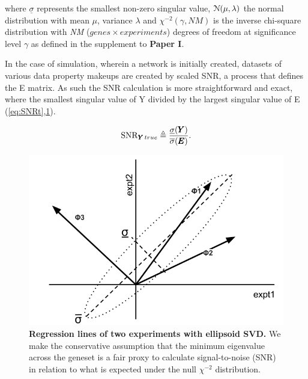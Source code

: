 where $\underline{\sigma}$ represents the smallest non-zero singular value, $\operatorname{\mathcal{N}(\mu,\lambda)}$ the normal distribution with mean $\mu$, variance $\lambda$ and $\chi^{-2}(\gamma,NM)$ is the inverse chi-square distribution with \emph{NM} ($genes \times experiments$) degrees of freedom at significance level $\gamma$ as defined in the supplement to \textbf{Paper I}.

In the case of simulation, wherein a network is initially created, datasets of various data property makeups are created by scaled SNR, a process that defines the E matrix. As such the SNR calculation is more straightforward and exact, where the smallest singular value of Y divided by the largest singular value of E (\cref{eq:SNRt},\cref{fig:SNR}).

\begin{equation}
    \operatorname{SNR}_{{\pmb{Y}}\,true} \triangleq \frac{\underline{\sigma}({\pmb{Y}})}{\overline{\sigma}({\pmb{E}})}.
  \label{eq:SNRt}
\end{equation} 

\begin{figure}[H]
  \begin{center}
    \includegraphics[width=1\linewidth]{4/matrixSNR.png}
  \end{center}
  \caption{\textbf{Regression lines of two experiments with ellipsoid SVD.} We make the conservative assumption that the minimum eigenvalue across the geneset is a fair proxy to calculate signal-to-noise (SNR) in relation to what is expected under the null $\chi^{-2}$ distribution.}
  \label{fig:SNR}
\end{figure}

